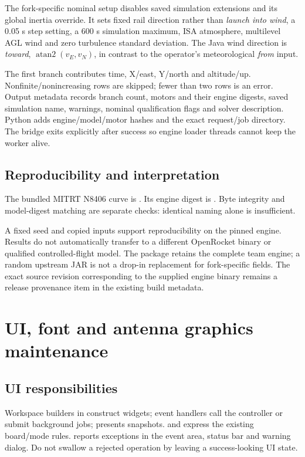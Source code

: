 The fork-specific nominal setup disables saved simulation extensions and its
global inertia override. It sets fixed rail direction rather than
\emph{launch into wind}, a 0.05 s step setting, a 600 s simulation maximum,
ISA atmosphere, multilevel AGL wind and zero turbulence standard deviation.
The Java wind direction is \emph{toward},
\(\operatorname{atan2}(v_E,v_N)\), in contrast to the operator's meteorological
\emph{from} input.

The first branch contributes time, X/east, Y/north and altitude/up.
Nonfinite/nonincreasing rows are skipped; fewer than two rows is an error.
Output metadata records branch count, motors and their engine digests, saved
simulation name, warnings, nominal qualification flags and solver description.
Python adds engine/model/motor hashes and the exact request/job directory.
The bridge exits explicitly after success so engine loader threads cannot keep
the worker alive.

\subsection{Reproducibility and interpretation}
The bundled MITRT N8406 curve is .
Its engine digest is
.
Byte integrity and model-digest matching are separate checks: identical naming
alone is insufficient.

A fixed seed and copied inputs support reproducibility on the pinned engine.
Results do not automatically transfer to a different OpenRocket binary or
qualified controlled-flight model. The package retains the complete team engine;
a random upstream JAR is not a drop-in replacement for fork-specific fields.
The exact source revision corresponding to the supplied engine binary remains
a release provenance item in the existing build metadata.

\section{UI, font and antenna graphics maintenance}\label{sec:graphics}
\subsection{UI responsibilities}
Workspace builders in  construct widgets; event handlers call
the controller or submit background jobs;  presents snapshots.
 and  express
the existing board/mode rules.  reports exceptions in the event area,
status bar and warning dialog. Do not swallow a rejected operation by leaving
a success-looking UI state.

